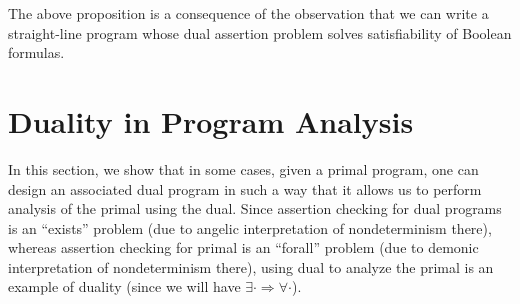 \documentclass[preprint]{sig-alternate-05-2015}
\newcommand\ignore[1]{{}}
\def\true{{\mathit{true}}}
\begin{document}
{The above proposition is a consequence of the observation that
we can write a straight-line program whose dual assertion
problem solves satisfiability of Boolean formulas. %

\ignore{
\begin{proof}(Sketch)
  As in the proof of Proposition~\ref{prop:coNPC},
  given a program, we guess a dual program state $\sigma$,
  and check if the state satisfies all the constraints.
  Let the nodes in the straight-line program be
  $v_0,v_1,\ldots,v_k$.
  For each $i\in\{1,\ldots,k\}$, we check
  if $\sigma$ is a satisfying assignment for each constraint
  $\semt(v_{i-1})(v_i)$.
  Finally, we check if $\sigma$ makes the assertion true.
  This shows that the dual assertion checking
  problem is in NP.
  For the hardness result, note that we encode 3-SAT
  exactly as in the proof of Proposition~\ref{prop:coNPC}
  and then check the assertion $x\approx\true$ in the end.
\end{proof}
\endignore}

\endignore}

\section{Duality in Program Analysis}
\label{sec:duality}

In this section, we show that in some cases, given a primal
program, one can design an associated dual program in such a way 
that it allows us to perform analysis of the primal using the dual.  
Since assertion checking for dual programs is an ``exists'' problem
(due to angelic interpretation of nondeterminism there), whereas
assertion checking for primal is an ``forall'' problem (due to
demonic interpretation of nondeterminism there), 
using dual to analyze the primal is an example of duality
(since we will have $\exists\cdot \Rightarrow \forall\cdot$).


% 
%
\end{document}
